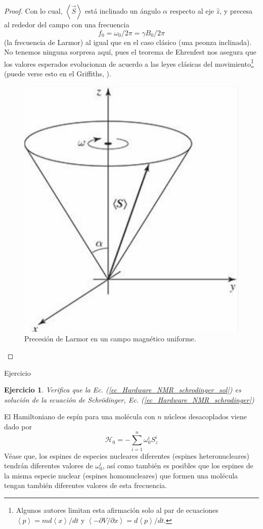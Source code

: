 \documentclass[a4paper,11pt]{book} %
\newtheorem{ejercicio_contador}{Ejercicio}
\newcommand{\Ejercicio}[1]{
		\begin{mybox_gray}{Ejercicio} 
			\begin{ejercicio_contador}
				 #1 
			\end{ejercicio_contador} 
		\end{mybox_gray}
	}
\numberwithin{equation}{chapter}
\begin{document}
\begin{proof}
Con lo cual, $\left\langle \vec{S} \right\rangle$ está inclinado un ángulo $\alpha$ respecto al eje $\hat{z}$, y precesa al rededor del campo con una frecuencia 
	\begin{equation}
	f_0 = \omega_0 / 2 \pi = \gamma B_0 / 2 \pi
	\end{equation}
(la frecuencia de Larmor) al igual que en el caso clásico (una peonza inclinada). No tenemos ninguna sorpresa aquí, pues el teorema de Ehrenfest nos asegura que los valores esperados evolucionan de acuerdo a las leyes clásicas del movimiento\footnote{Algunos autores limitan esta afirmación solo al par de ecuaciones $\left\langle p \right\rangle = m d \left\langle x \right\rangle / dt$ y $\left\langle - \partial V / \partial x \right\rangle = d \left\langle p \right\rangle / dt$.} (puede verse esto en el Griffiths, \cite{griffiths_schroeter_2018}). 
	\begin{figure}[H]
	\centering 
	\includegraphics[width=0.30\linewidth]{Figuras/Fig_Harware_NMR_precession_griffiths}
	\caption{Precesión de Larmor en un campo magnético uniforme.}
	\label{Fig_Harware_NMR_precession_griffiths}
	\end{figure}

\end{proof}


	\Ejercicio{Verifica que la Ec. (\ref{ec_Hardware_NMR_schrodinger_sol}) es solución de la ecuación de Schrödinger, Ec. (\ref{ec_Hardware_NMR_schrodinger})}

El Hamiltoniano de espín para una molécula con $n$ núcleos desacoplados viene dado por 
	\begin{equation} \label{ec_Hardware_NMR_H_single}
	\mathcal{H}_0 = - \sum_{i=1}^n  \omega_0^i S_z^i
	\end{equation}
Véase que, los espines de especies nucleares diferentes (espines heteronucleares) tendrán diferentes valores de $\omega_0^i$, así como también es posibles que los espines de la misma especie nuclear (espines homonucleares) que formen una molécula  tengan también diferentes valores de esta frecuencia.
\end{document}
